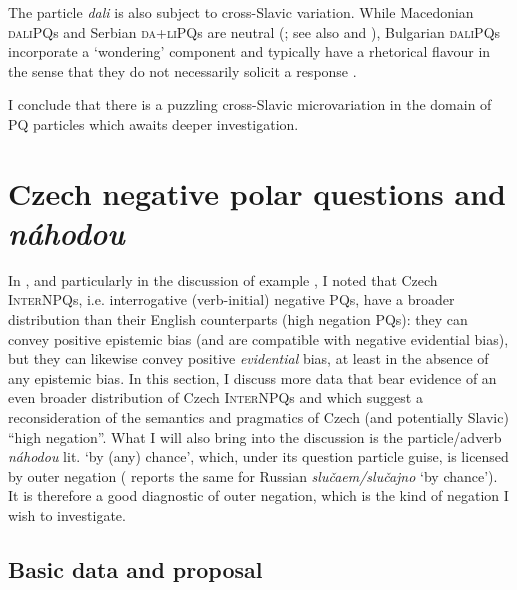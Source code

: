 \documentclass[output=paper,colorlinks,citecolor=brown]{langscibook}
\begin{document}
The particle \textit{dali} is also subject to cross-Slavic variation. While Macedonian \textsc{daliPQ}s and Serbian \textsc{da+liPQ}s are neutral (; see also \citealt{Jordanoska.Meertens2021} and \citealt{Todorovic2023}), Bulgarian \textsc{daliPQ}s incorporate a `wondering' component and typically have a rhetorical flavour in the sense that they do not necessarily solicit a response \citep{Simeonova.Kamali2024}.

I conclude that there is a puzzling cross-Slavic microvariation in the domain of PQ particles which awaits deeper investigation.

\section{Czech negative polar questions and \textit{náhodou}}\label{sim:sec:czech}

In , and particularly in the discussion of example , I noted that Czech \textsc{InterNPQ}s, i.e. interrogative (verb-initial) negative PQs, have a broader distribution than their English counterparts (high negation PQs): they can convey positive epistemic bias (and are compatible with negative evidential bias), but they can likewise convey positive \textit{evidential} bias, at least in the absence of any epistemic bias. In this section, I discuss more data that bear evidence of an even broader distribution of Czech \textsc{InterNPQ}s and which suggest a reconsideration of the semantics and pragmatics of Czech (and potentially Slavic) ``high negation''. What I will also bring into the discussion is the particle/adverb \textit{náhodou} lit. `by (any) chance', which, under its question particle guise, is licensed by outer negation (\citealt{Zanon2023} reports the same for Russian \textit{slučaem/slučajno} `by chance').
It is therefore a good diagnostic of outer negation, which is the kind of negation I wish to investigate.

\subsection{Basic data and proposal}
\end{document}
